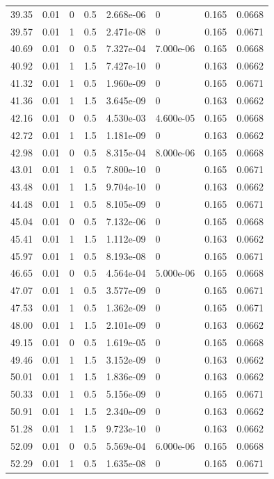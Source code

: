 \documentclass[preview]{standalone}
\begin{document}
{{{\begin{tabular}{L{1.2cm}C{1.2cm} C{0.3cm}C{0.5cm} C{1.4cm}C{1.4cm} C{1.4cm}C{1.4cm}}
  39.35  &  0.01  & 0     & 0.5 &  2.668e-06  & 0  & 0.165 &  0.0668   \\ 
  39.57  &  0.01  & 1     & 0.5 &  2.471e-08  & 0  & 0.165 &  0.0671   \\ 
  40.69  &  0.01  & 0     & 0.5 &  7.327e-04  & 7.000e-06  & 0.165 &  0.0668   \\ 
  40.92  &  0.01  & 1     & 1.5 &  7.427e-10  & 0  & 0.163 &  0.0662   \\ 
  41.32  &  0.01  & 1     & 0.5 &  1.960e-09  & 0  & 0.165 &  0.0671   \\ 
  41.36  &  0.01  & 1     & 1.5 &  3.645e-09  & 0  & 0.163 &  0.0662   \\ 
  42.16  &  0.01  & 0     & 0.5 &  4.530e-03  & 4.600e-05  & 0.165 &  0.0668   \\ 
  42.72  &  0.01  & 1     & 1.5 &  1.181e-09  & 0  & 0.163 &  0.0662   \\ 
  42.98  &  0.01  & 0     & 0.5 &  8.315e-04  & 8.000e-06  & 0.165 &  0.0668   \\ 
  43.01  &  0.01  & 1     & 0.5 &  7.800e-10  & 0  & 0.165 &  0.0671   \\ 
  43.48  &  0.01  & 1     & 1.5 &  9.704e-10  & 0  & 0.163 &  0.0662   \\ 
  44.48  &  0.01  & 1     & 0.5 &  8.105e-09  & 0  & 0.165 &  0.0671   \\ 
  45.04  &  0.01  & 0     & 0.5 &  7.132e-06  & 0  & 0.165 &  0.0668   \\ 
  45.41  &  0.01  & 1     & 1.5 &  1.112e-09  & 0  & 0.163 &  0.0662   \\ 
  45.97  &  0.01  & 1     & 0.5 &  8.193e-08  & 0  & 0.165 &  0.0671   \\ 
  46.65  &  0.01  & 0     & 0.5 &  4.564e-04  & 5.000e-06  & 0.165 &  0.0668   \\ 
  47.07  &  0.01  & 1     & 0.5 &  3.577e-09  & 0  & 0.165 &  0.0671   \\ 
  47.53  &  0.01  & 1     & 0.5 &  1.362e-09  & 0  & 0.165 &  0.0671   \\ 
  48.00  &  0.01  & 1     & 1.5 &  2.101e-09  & 0  & 0.163 &  0.0662   \\ 
  49.15  &  0.01  & 0     & 0.5 &  1.619e-05  & 0  & 0.165 &  0.0668   \\ 
  49.46  &  0.01  & 1     & 1.5 &  3.152e-09  & 0  & 0.163 &  0.0662   \\ 
  50.01  &  0.01  & 1     & 1.5 &  1.836e-09  & 0  & 0.163 &  0.0662   \\ 
  50.33  &  0.01  & 1     & 0.5 &  5.156e-09  & 0  & 0.165 &  0.0671   \\ 
  50.91  &  0.01  & 1     & 1.5 &  2.340e-09  & 0  & 0.163 &  0.0662   \\ 
  51.28  &  0.01  & 1     & 1.5 &  9.723e-10  & 0  & 0.163 &  0.0662   \\ 
  52.09  &  0.01  & 0     & 0.5 &  5.569e-04  & 6.000e-06  & 0.165 &  0.0668   \\ 
  52.29  &  0.01  & 1     & 0.5 &  1.635e-08  & 0  & 0.165 &  0.0671   \\ 
\hline 
\end{tabular} 

}}}
\end{document}
